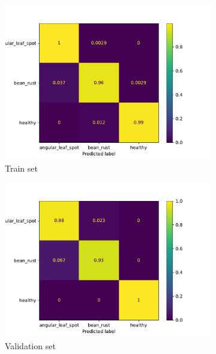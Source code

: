 \documentclass[10pt, a4paper]{article}
\begin{document}
\begin{figure}[htpb]
  \centering
  \begin{subfigure}[b]{0.32\textwidth}
      \centering
      \includegraphics[width=\textwidth]{images/cm_train.pdf}
      \caption{Train set}
      \label{fig:cm_train}
  \end{subfigure}
  \hfill
  \begin{subfigure}[b]{0.32\textwidth}
      \centering
      \includegraphics[width=\textwidth]{images/cm_val.pdf}
      \caption{Validation set}
      \label{fig:cm_val}
  \end{subfigure}
  \hfill
  \begin{subfigure}[b]{0.32\textwidth}
      \centering

\end{subfigure}
\end{figure}
\end{document}
